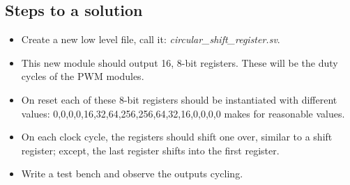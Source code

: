 
\subsection{Steps to a solution}
\begin{itemize}
    \item Create a new low level file, call it: \textit{circular\_shift\_register.sv}.
    \item This new module should output 16, 8-bit registers. These will be the duty cycles of the PWM modules.
    \item On reset each of these 8-bit registers should be instantiated with different values: 0,0,0,0,16,32,64,256,256,64,32,16,0,0,0,0 makes for reasonable values.
    \item On each clock cycle, the registers should shift one over, similar to a shift register; except, the last register shifts into the first register.
    \item Write a test bench and observe the outputs cycling.
\end{itemize}


